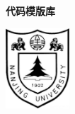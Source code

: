 \documentclass[9pt,landscape]{article}
\begin{document}
\thispagestyle{empty}
\null\vfill
\begin{center}
\Huge \textbf{代码模版库}

\vspace{1.5cm}

\includegraphics[height=3cm]{njulogo.pdf}
\end{center}
\vfill
\clearpage

\begin{multicols}{2}
\tableofcontents
\end{multicols}

\newpage

\columnseprule=0.25pt

\begin{multicols}{2}

\end{multicols}
\end{document}
